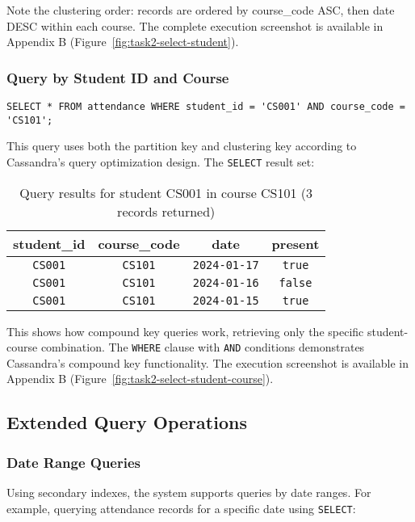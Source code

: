 Note the clustering order: records are ordered by course\_code ASC, then date DESC within each course. The complete execution screenshot is available in Appendix B (Figure~\ref{fig:task2-select-student}).

\subsubsection{Query by Student ID and Course}
\begin{verbatim}
SELECT * FROM attendance WHERE student_id = 'CS001' AND course_code = 'CS101';
\end{verbatim}

This query uses both the partition key and clustering key according to Cassandra's query optimization design. The \texttt{SELECT} result set:

\begin{table}[H]
  \centering
  \footnotesize
  \begin{tabular}{|c|c|c|c|}
    \hline
    \textbf{student\_id} & \textbf{course\_code} & \textbf{date} & \textbf{present} \\
    \hline
    \texttt{CS001}                & \texttt{CS101}                 & \texttt{2024-01-17}    & \texttt{true}             \\
    \texttt{CS001}                & \texttt{CS101}                 & \texttt{2024-01-16}    & \texttt{false}            \\
    \texttt{CS001}                & \texttt{CS101}                 & \texttt{2024-01-15}    & \texttt{true}             \\
    \hline
  \end{tabular}
  \caption{Query results for student CS001 in course CS101 (3 records returned)}
\end{table}

This shows how compound key queries work, retrieving only the specific student-course combination. The \texttt{WHERE} clause with \texttt{AND} conditions demonstrates Cassandra's compound key functionality. The execution screenshot is available in Appendix B (Figure~\ref{fig:task2-select-student-course}).

\subsection{Extended Query Operations}

\subsubsection{Date Range Queries}
Using secondary indexes, the system supports queries by date ranges. For example, querying attendance records for a specific date using \texttt{SELECT}:

